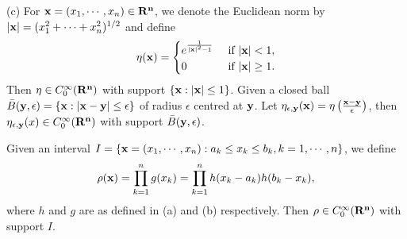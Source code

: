 \begin{exercise}{9.4}
  (c) For $\mathbf{x}=(x_1,\cdots,x_n)\in\mathbf{R^n}$, we denote the Euclidean norm by $|\mathbf{x}|=(x_1^2+\cdots+x_n^2)^{1/2}$ and define 
  $$  \eta(\mathbf{x})= \begin{cases}e^{\frac{1}{|\mathbf{x}|^2-1}} & \text { if } |\mathbf{x}|<1,  \\ 0 & \text { if } |\mathbf{x}|\geq 1.\end{cases}$$
  Then $\eta\in C_0^\infty(\mathbf{R^n})$ with support $\{\mathbf{x}:|\mathbf{x}|\leq1\}$.
  Given a closed ball $\bar{B}(\mathbf{y},\epsilon)=\{\mathbf{x}:|\mathbf{x}-\mathbf{y}|\leq\epsilon\}$ of radius $\epsilon$ centred at $\mathbf{y}$. Let $\eta_{\epsilon,\mathbf{y}}(\mathbf{x})=\eta\left(\frac{\mathbf{x}-\mathbf{y}}{\epsilon}\right)$, then $\eta_{\epsilon,\mathbf{y}}(x)\in C_0^\infty(\mathbf{R^n})$ with support $\bar{B}(\mathbf{y},\epsilon)$. 
  
  Given an interval $I=\{\mathbf{x}=(x_1,\cdots,x_n): a_k\leq x_k\leq b_k, k=1,\cdots,n\}$, we define $$\rho(\mathbf{x})=\prod_{k=1}^ng(x_k)=\prod_{k=1}^nh(x_k-a_k)h(b_k-x_k),$$
  where $h$ and $g$ are as defined in (a) and (b) respectively. Then $\rho\in  C_0^\infty(\mathbf{R^n})$ with support $I$.
\end{exercise}
